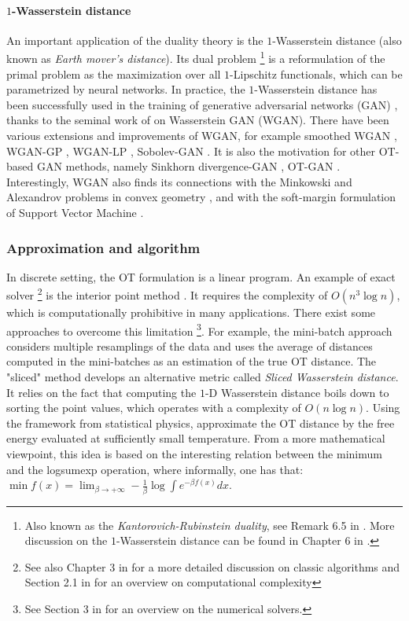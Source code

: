 \paragraph{$1$-Wasserstein distance}
An important application of the duality theory is the $1$-Wasserstein distance
(also known as \textit{Earth mover's distance}). Its dual problem
\footnote{Also known as the \textit{Kantorovich-Rubinstein duality}, see Remark 6.5
in \citep{Villani08}. More discussion on the $1$-Wasserstein distance can be found
in Chapter 6 in \citep{Peyre19}.}
is a reformulation of the primal problem as the maximization over all $1$-Lipschitz functionals,
which can be parametrized by neural networks.
In practice, the $1$-Wasserstein distance has been successfully used
in the training of generative adversarial networks (GAN) \citep{Goodfellow14},
thanks to the seminal work of \citet{Arjovsky17} on Wasserstein GAN (WGAN).
There have been various extensions and improvements of WGAN, for example
smoothed WGAN \citep{Sanjabi18}, WGAN-GP \citep{Gulrajani17}, WGAN-LP \citep{Petzka18},
Sobolev-GAN \citep{Mroueh17}. It is also the motivation for other OT-based GAN methods, namely
Sinkhorn divergence-GAN \citep{Genevay18a}, OT-GAN \citep{Salimans18}.
Interestingly, WGAN also finds its connections with the Minkowski and Alexandrov problems
in convex geometry \citep{Lei19}, and with the soft-margin formulation of
Support Vector Machine \citep{Jolicoeur19}.

\subsubsection{Approximation and algorithm}
In discrete setting, the OT formulation is a linear program.
An example of exact solver \footnote{See also Chapter 3 in \citep{Peyre19}
for a more detailed discussion on classic algorithms and Section 2.1 in \citep{Pele09}
for an overview on computational complexity}
is the interior point method \citep{Orlin88}. It requires the complexity of $O(n^3 \log n)$,
which is computationally prohibitive in many applications.
There exist some approaches to overcome this limitation
\footnote{See Section 3 in \citep{Bonneel23} for an overview on the numerical solvers.}.
For example, the mini-batch approach
\citep{Sommerfeld19,Fatras20} considers multiple resamplings of the data and
uses the average of distances computed in the mini-batches as an estimation of the true OT distance.
The "sliced" method \citep{Rabin12,Bonneel15} develops an alternative metric
called \textit{Sliced Wasserstein distance}.
It relies on the fact that computing the $1$-D Wasserstein distance boils down to sorting the
point values, which operates with a complexity of $O(n \log n)$.
Using the framework from statistical physics, \citet{Koehl19}
approximate the OT distance by the free energy evaluated at sufficiently small temperature.
From a more mathematical viewpoint, this idea is based on the interesting relation
between the minimum and the logsumexp operation, where informally, one has that:
$\min f(x) = \lim_{\beta \to +\infty} -\frac{1}{\beta} \log \int e^{-\beta f(x)} dx$.

